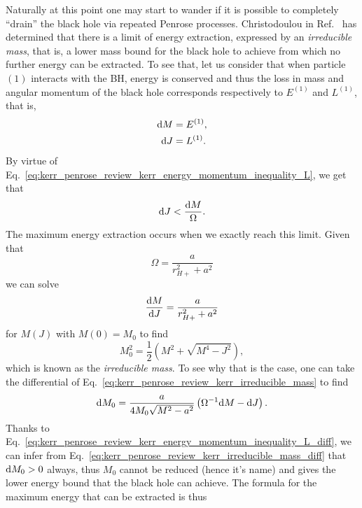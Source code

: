 Naturally at this point one may start to wander if it is possible to completely ``drain'' the black hole via repeated Penrose processes. Christodoulou in Ref.~\cite{CHRISTODOULOU1970} has determined that there is a limit of energy extraction, expressed by an \emph{irreducible mass}, that is, a lower mass bound for the black hole to achieve from which no further energy can be extracted. To see that, let us consider that when particle $(1)$ interacts with the BH, energy is conserved and thus the loss in mass and angular momentum of the black hole corresponds respectively to $E^{(1)}$ and $L^{(1)}$, that is,
%
\begin{align}
  \mathrm{d} M & = E^{(1)} \label{eq:kerr_penrose_review_kerr_mass_change}, \\
  \mathrm{d} J & = L^{(1)} \label{eq:kerr_penrose_review_kerr_L_change}.
\end{align}
%
By virtue of Eq.~\eqref{eq:kerr_penrose_review_kerr_energy_momentum_inequality_L}, we get that
%
\begin{equation}
  \mathrm{d} J < \frac{\mathrm{d} M}{\Omega}.
  \label{eq:kerr_penrose_review_kerr_energy_momentum_inequality_L_diff}
\end{equation}
%
The maximum energy extraction occurs when we exactly reach this limit. Given that
%
\begin{equation}
  \Omega = \frac{a}{r_{H+}^2 + a^2}
  \label{eq:kerr_penrose_review_kerr_angular_momentum_def}
\end{equation}
%
we can solve
%
\begin{equation}
  \frac{\mathrm{d} M}{\mathrm{d} J} = \frac{a}{r_{H+}^2 + a^2}
  \label{eq:kerr_penrose_review_kerr_mass_ODE}
\end{equation}
%
for $M(J)$ with $M(0) = M_0$ to find
%
\begin{equation}
  M_0^2 = \frac{1}{2}\left( M^2 + \sqrt{M^4 - J^2} \right),
  \label{eq:kerr_penrose_review_kerr_irreducible_mass}
\end{equation}
%
which is known as the \emph{irreducible mass}. To see why that is the case, one can take the differential of Eq.~\eqref{eq:kerr_penrose_review_kerr_irreducible_mass} to find
%
\begin{equation}
  \mathrm{d} M_0 = \frac{a}{4 M_0 \sqrt{M^2 - a^2}}\left( \Omega^{-1} \mathrm{d} M - \mathrm{d} J \right).
  \label{eq:kerr_penrose_review_kerr_irreducible_mass_diff}
\end{equation}
%
Thanks to Eq.~\eqref{eq:kerr_penrose_review_kerr_energy_momentum_inequality_L_diff}, we can infer from Eq.~\eqref{eq:kerr_penrose_review_kerr_irreducible_mass_diff} that $\mathrm{d} M_0 > 0$ always, thus $M_0$ cannot be reduced (hence it's name) and gives the lower energy bound that the black hole can achieve. The formula for the maximum energy that can be extracted is thus
